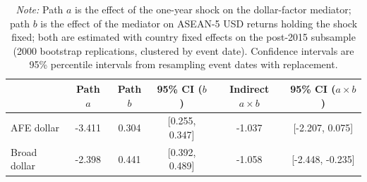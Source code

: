 \begin{table}[H]
\centering
\caption{Mediation Decomposition, Post-2015 Subsample: Cluster-Bootstrap Inference}
\label{tab:mediationboot}
\begin{tabular}{lccccc}
\hline
 & Path $a$ & Path $b$ & 95\% CI ($b$) & Indirect $a \times b$ & 95\% CI ($a \times b$) \\
\hline
AFE dollar & -3.411 & 0.304 & [0.255, 0.347] & -1.037 & [-2.207, 0.075] \\
Broad dollar & -2.398 & 0.441 & [0.392, 0.489] & -1.058 & [-2.448, -0.235] \\
\hline
\end{tabular}
\caption*{\footnotesize\textit{Note:} Path $a$ is the effect of the one-year shock on the dollar-factor mediator; path $b$ is the effect of the mediator on ASEAN-5 USD returns holding the shock fixed; both are estimated with country fixed effects on the post-2015 subsample (2000 bootstrap replications, clustered by event date). Confidence intervals are 95\% percentile intervals from resampling event dates with replacement.}
\end{table}
